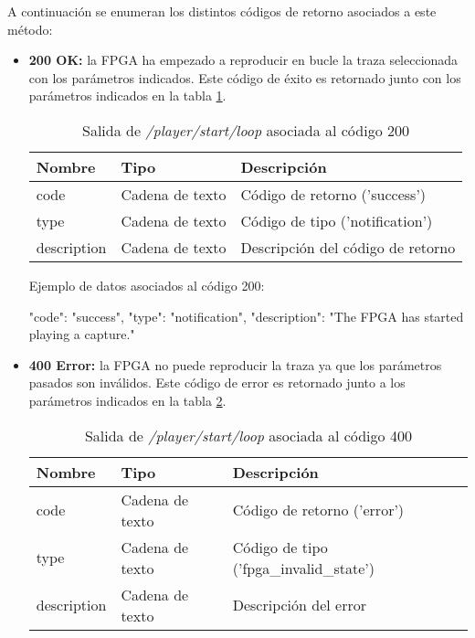 A continuación se enumeran los distintos códigos de retorno asociados a este método:
\begin{itemize}

\item{\textbf{200 OK:} la \gls{FPGA} ha empezado a reproducir en bucle la \gls{traza} seleccionada con los parámetros indicados. Este código de éxito es retornado junto con los parámetros indicados en la tabla \ref{extra:api:playerstartloop:ok}.
\begin{table}[H]
\centering
\begin{tabular}{|l|l|l|}
\hline
\rowcolor[HTML]{F5F5F5}
\textbf{Nombre}  & \textbf{Tipo}   & \textbf{Descripción}              \\ \hline
code             & Cadena de texto & Código de retorno ('success')     \\ \hline
type             & Cadena de texto & Código de tipo ('notification')   \\ \hline
description      & Cadena de texto & Descripción del código de retorno \\ \hline
\end{tabular}
\caption{Salida de \textit{/player/start/loop} asociada al código 200}
\label{extra:api:playerstartloop:ok}
\end{table}
\begin{minipage}{\textwidth}
Ejemplo de datos asociados al código 200:

\begin{code}[language=json]
{
  "code": "success",
  "type": "notification",
  "description": "The FPGA has started playing a capture."
}
\end{code}
\end{minipage}
}

\item{\textbf{400 Error:} la \gls{FPGA} no puede reproducir la \gls{traza} ya que los parámetros pasados son inválidos. Este código de error es retornado junto a los parámetros indicados en la tabla \ref{extra:api:playerstartloop:error400}.
\begin{table}[H]
\centering
\begin{tabular}{|l|l|l|}
\hline
\rowcolor[HTML]{F5F5F5}
\textbf{Nombre}  & \textbf{Tipo}   & \textbf{Descripción}                    \\ \hline
code             & Cadena de texto & Código de retorno ('error')             \\ \hline
type             & Cadena de texto & Código de tipo ('fpga\_invalid\_state') \\ \hline
description      & Cadena de texto & Descripción del error                   \\ \hline
\end{tabular}
\caption{Salida de \textit{/player/start/loop} asociada al código 400}
\label{extra:api:playerstartloop:error400}
\end{table}

}
\end{itemize}
